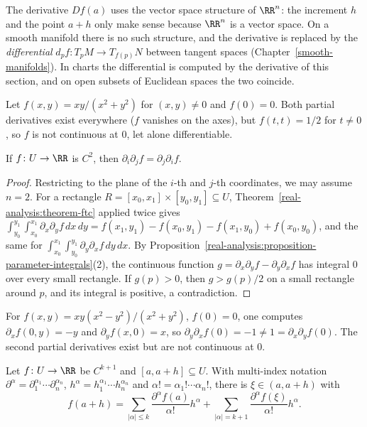 The derivative $Df(a)$ uses the vector space structure of $\RR^n$: the increment $h$ and the point $a + h$ only make sense because $\RR^n$ is a vector space. On a smooth manifold there is no such structure, and the
derivative is replaced by the \emph{differential} $d_pf \colon T_pM \to T_{f(p)}N$ between tangent spaces (Chapter~\ref{smooth-manifolds}). In charts the differential is computed by the derivative of this section, and on
open subsets of Euclidean spaces the two coincide.

\begin{counterexample}\label{real-analysis:counterexample-partials}
Let $f(x, y) = xy/(x^2 + y^2)$ for $(x, y) \neq 0$ and $f(0) = 0$. Both partial derivatives exist everywhere ($f$ vanishes on the axes), but $f(t, t) = 1/2$ for $t \neq 0$, so $f$ is not continuous at $0$, let
alone differentiable.
\end{counterexample}

\begin{theorem}[Schwarz]\label{real-analysis:theorem-schwarz}
If $f \colon U \to \RR$ is $C^2$, then $\partial_i\partial_jf = \partial_j\partial_if$.
\end{theorem}

\begin{proof}
Restricting to the plane of the $i$-th and $j$-th coordinates, we may assume $n = 2$. For a rectangle $R = [x_0, x_1] \times [y_0, y_1] \subseteq U$, Theorem~\ref{real-analysis:theorem-ftc} applied twice gives
$\int_{y_0}^{y_1}\int_{x_0}^{x_1}\partial_x\partial_yf\,dx\,dy = f(x_1, y_1) - f(x_0, y_1) - f(x_1, y_0) + f(x_0, y_0)$, and the same for $\int_{x_0}^{x_1}\int_{y_0}^{y_1}\partial_y\partial_xf\,dy\,dx$. By
Proposition~\ref{real-analysis:proposition-parameter-integrals}(2), the continuous function $g = \partial_x\partial_yf - \partial_y\partial_xf$ has integral $0$ over every small rectangle. If $g(p) > 0$, then $g > g(p)/2$ on a small
rectangle around $p$, and its integral is positive, a contradiction.
\end{proof}

\begin{counterexample}\label{real-analysis:counterexample-schwarz}
For $f(x, y) = xy(x^2 - y^2)/(x^2 + y^2)$, $f(0) = 0$, one computes $\partial_xf(0, y) = -y$ and $\partial_yf(x, 0) = x$, so $\partial_y\partial_xf(0) = -1 \neq 1 = \partial_x\partial_yf(0)$. The second partial derivatives
exist but are not continuous at $0$.
\end{counterexample}

\begin{theorem}\label{real-analysis:theorem-taylor-several}
Let $f \colon U \to \RR$ be $C^{k+1}$ and $[a, a + h] \subseteq U$. With multi-index notation $\partial^\alpha = \partial_1^{\alpha_1} \cdots \partial_n^{\alpha_n}$, $h^\alpha = h_1^{\alpha_1} \cdots h_n^{\alpha_n}$ and
$\alpha! = \alpha_1! \cdots \alpha_n!$, there is $\xi \in (a, a + h)$ with
\[
f(a + h) = \sum_{|\alpha| \leq k}\frac{\partial^\alpha f(a)}{\alpha!}h^\alpha + \sum_{|\alpha| = k+1}\frac{\partial^\alpha f(\xi)}{\alpha!}h^\alpha.
\]
\end{theorem}

